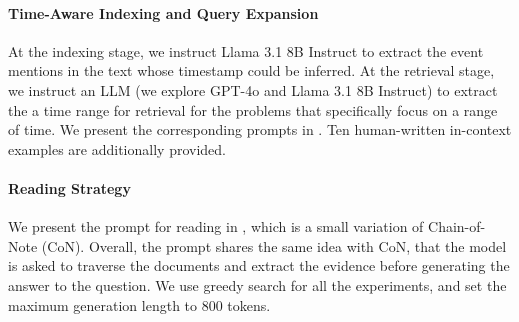 \paragraph{Time-Aware Indexing and Query Expansion} At the indexing stage, we instruct Llama 3.1 8B Instruct to extract the event mentions in the text whose timestamp could be inferred. At the retrieval stage, we instruct an LLM (we explore GPT-4o and Llama 3.1 8B Instruct) to extract the a time range for retrieval for the problems that specifically focus on a range of time. We present the corresponding prompts in . Ten human-written in-context examples are additionally provided. 


\paragraph{Reading Strategy} We present the prompt for reading in , which is a small variation of Chain-of-Note (CoN). Overall, the prompt shares the same idea with CoN, that the model is asked to traverse the documents and extract the evidence before generating the answer to the question. We use greedy search for all the experiments, and set the maximum generation length to 800 tokens.





